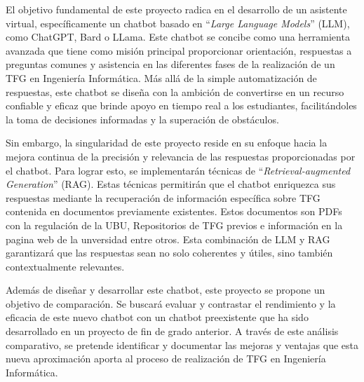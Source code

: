 
El objetivo fundamental de este proyecto radica en el desarrollo de un asistente virtual, específicamente un chatbot basado en ``\textit{Large Language Models}'' (LLM), como ChatGPT, Bard o LLama. Este chatbot se concibe como una herramienta avanzada que tiene como misión principal proporcionar orientación, respuestas a preguntas comunes y asistencia en las diferentes fases de la realización de un TFG en Ingeniería Informática. Más allá de la simple automatización de respuestas, este chatbot se diseña con la ambición de convertirse en un recurso confiable y eficaz que brinde apoyo en tiempo real a los estudiantes, facilitándoles la toma de decisiones informadas y la superación de obstáculos.

Sin embargo, la singularidad de este proyecto reside en su enfoque hacia la mejora continua de la precisión y relevancia de las respuestas proporcionadas por el chatbot. Para lograr esto, se implementarán técnicas de ``\textit{Retrieval-augmented Generation}'' (RAG). Estas técnicas permitirán que el chatbot enriquezca sus respuestas mediante la recuperación de información específica sobre TFG contenida en documentos previamente existentes. Estos documentos son PDFs con la regulación de la UBU, Repositorios de TFG previos e información en la pagina web de la unversidad entre otros. Esta combinación de LLM y RAG garantizará que las respuestas sean no solo coherentes y útiles, sino también contextualmente relevantes.

Además de diseñar y desarrollar este chatbot, este proyecto se propone un objetivo de comparación. Se buscará evaluar y contrastar el rendimiento y la eficacia de este nuevo chatbot con un chatbot preexistente que ha sido desarrollado en un proyecto de fin de grado anterior. A través de este análisis comparativo, se pretende identificar y documentar las mejoras y ventajas que esta nueva aproximación aporta al proceso de realización de TFG en Ingeniería Informática.


